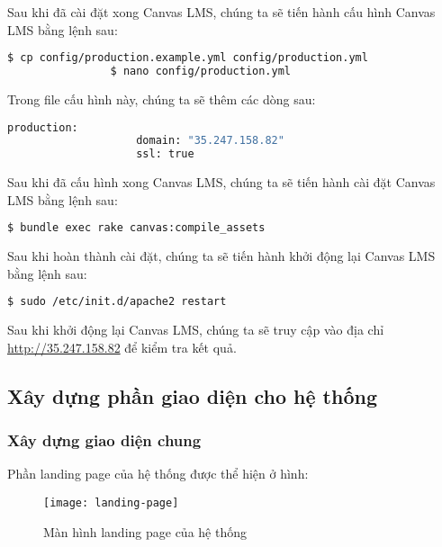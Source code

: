 \documentclass[../Thesis.tex]{subfiles}
\begin{document}
\begin{enumerate}
            Sau khi đã cài đặt xong Canvas LMS, chúng ta sẽ tiến hành cấu hình Canvas LMS bằng lệnh sau:
            \begin{lstlisting}[language=bash]
                $ cp config/production.example.yml config/production.yml
                $ nano config/production.yml
            \end{lstlisting}

            Trong file cấu hình này, chúng ta sẽ thêm các dòng sau:
            \begin{lstlisting}[language=bash]
                production:
                    domain: "35.247.158.82"
                    ssl: true
            \end{lstlisting}

            Sau khi đã cấu hình xong Canvas LMS, chúng ta sẽ tiến hành cài đặt Canvas LMS bằng lệnh sau:
            \begin{lstlisting}[language=bash]
                $ bundle exec rake canvas:compile_assets
            \end{lstlisting}

        Sau khi hoàn thành cài đặt, chúng ta sẽ tiến hành khởi động lại Canvas LMS bằng lệnh sau:
            \begin{lstlisting}[language=bash]
                $ sudo /etc/init.d/apache2 restart
            \end{lstlisting}

            Sau khi khởi động lại Canvas LMS, chúng ta sẽ truy cập vào địa chỉ \url{http://35.247.158.82} để kiểm tra kết quả.
        \end{enumerate}

    \subsection{Xây dựng phần giao diện cho hệ thống}
    \label{subsec:xay-dung-giao-dien}
    \subsubsection{Xây dựng giao diện chung}
    \label{subsubsec:xay-dung-giao-dien-chung}
        Phần landing page của hệ thống được thể hiện ở hình:
        \begin{figure}[ht!]
            \centering\texttt{[image: landing-page]}
            \caption{Màn hình landing page của hệ thống}
            \label{fig:landing-page}
        \end{figure}
\end{document}
